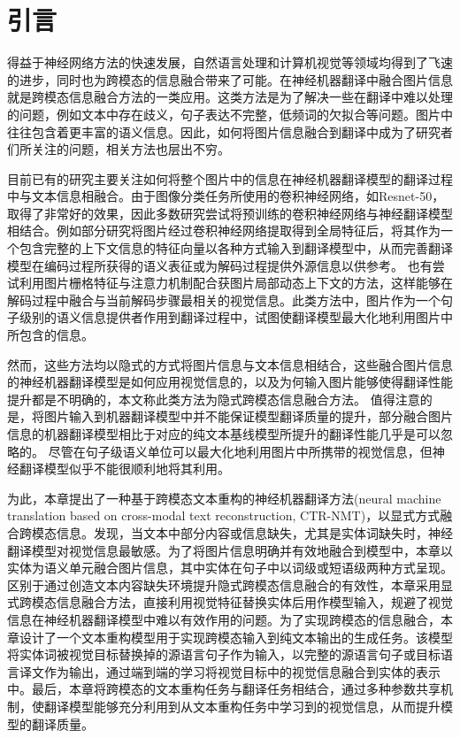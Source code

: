 \section{引言}
得益于神经网络方法的快速发展，自然语言处理和计算机视觉等领域均得到了飞速的进步，同时也为跨模态的信息融合带来了可能。在神经机器翻译中融合图片信息就是跨模态信息融合方法的一类应用。这类方法是为了解决一些在翻译中难以处理的问题，例如文本中存在歧义，句子表达不完整，低频词的欠拟合等问题。图片中往往包含着更丰富的语义信息。因此，如何将图片信息融合到翻译中成为了研究者们所关注的问题，相关方法也层出不穷。

目前已有的研究主要关注如何将整个图片中的信息在神经机器翻译模型的翻译过程中与文本信息相融合。由于图像分类任务所使用的卷积神经网络，如Resnet-50，取得了非常好的效果，因此多数研究尝试将预训练的卷积神经网络与神经翻译模型相结合。例如部分研究将图片经过卷积神经网络提取得到全局特征后，将其作为一个包含完整的上下文信息的特征向量以各种方式输入到翻译模型中，从而完善翻译模型在编码过程所获得的语义表征或为解码过程提供外源信息以供参考。
也有尝试利用图片栅格特征与注意力机制配合获图片局部动态上下文的方法，这样能够在解码过程中融合与当前解码步骤最相关的视觉信息。此类方法中，图片作为一个句子级别的语义信息提供者作用到翻译过程中，试图使翻译模型最大化地利用图片中所包含的信息。

然而，这些方法均以隐式的方式将图片信息与文本信息相结合，这些融合图片信息的神经机器翻译模型是如何应用视觉信息的，以及为何输入图片能够使得翻译性能提升都是不明确的，本文称此类方法为隐式跨模态信息融合方法。
值得注意的是，将图片输入到机器翻译模型中并不能保证模型翻译质量的提升，部分融合图片信息的机器翻译模型相比于对应的纯文本基线模型所提升的翻译性能几乎是可以忽略的。
尽管在句子级语义单位可以最大化地利用图片中所携带的视觉信息，但神经翻译模型似乎不能很顺利地将其利用。

为此，本章提出了一种基于跨模态文本重构的神经机器翻译方法(neural machine translation based on cross-modal text reconstruction, CTR-NMT)，以显式方式融合跨模态信息。发现，当文本中部分内容或信息缺失，尤其是实体词缺失时，神经翻译模型对视觉信息最敏感。为了将图片信息明确并有效地融合到模型中，本章以实体为语义单元融合图片信息，其中实体在句子中以词级或短语级两种方式呈现。区别于通过创造文本内容缺失环境提升隐式跨模态信息融合的有效性，本章采用显式跨模态信息融合方法，直接利用视觉特征替换实体后用作模型输入，规避了视觉信息在神经机器翻译模型中难以有效作用的问题。为了实现跨模态的信息融合，本章设计了一个文本重构模型用于实现跨模态输入到纯文本输出的生成任务。该模型将实体词被视觉目标替换掉的源语言句子作为输入，以完整的源语言句子或目标语言译文作为输出，通过端到端的学习将视觉目标中的视觉信息融合到实体的表示中。最后，本章将跨模态的文本重构任务与翻译任务相结合，通过多种参数共享机制，使翻译模型能够充分利用到从文本重构任务中学习到的视觉信息，从而提升模型的翻译质量。

